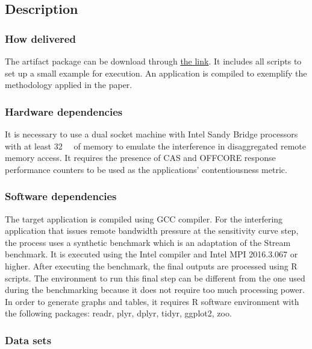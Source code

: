\documentclass{sigplanconf}
\begin{document}
	\subsection{Description}
	
	\subsubsection{How delivered} 
	
	The artifact package can be download through \href{https://zenodo.org/record/3749250/files/artifact.tar.gz?download=1}{the link}. It includes all
	scripts to set up a small example for execution. An application is compiled to exemplify
	the methodology applied in the paper. 
	
	\subsubsection{Hardware dependencies} 
	
	It is necessary to use a dual socket machine with Intel Sandy Bridge processors with at
	least \SI{32}{\giga\byte} of memory to emulate the interference in disaggregated remote
	memory access. It requires the presence of CAS and OFFCORE response performance
	counters to be used as the applications' contentiousness metric.  
	
	\subsubsection{Software dependencies} 
	
	The target application is compiled using GCC compiler. For the interfering application
	that issues remote bandwidth pressure at the sensitivity curve step, the process uses a
	synthetic benchmark which is an adaptation of the Stream benchmark. It is executed using
	the Intel compiler and Intel MPI 2016.3.067 or higher. After executing the benchmark, the final outputs are processed using R scripts. The
	environment to run this final step can be different from the one used during the
	benchmarking because it does not require too much processing power. In order to generate
	graphs and tables, it requires R software environment with the following packages: readr,
	plyr, dplyr, tidyr, ggplot2, zoo. 
	
	
	\subsubsection{Data sets}
	
\end{document}
